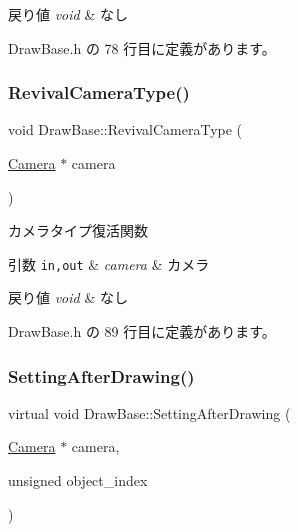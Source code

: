 \begin{DoxyRetVals}{戻り値}
{\em void} & なし \\
\hline
\end{DoxyRetVals}


 Draw\+Base.\+h の 78 行目に定義があります。

\mbox{\label{class_draw_base_a48b144e61928b7658c7a849017e40c79}} 
\subsubsection{\texorpdfstring{Revival\+Camera\+Type()}{RevivalCameraType()}}
{\footnotesize\ttfamily void Draw\+Base\+::\+Revival\+Camera\+Type (\begin{DoxyParamCaption}\item[{\mbox{\hyperlink{class_camera}{Camera}} $\ast$}]{camera }\end{DoxyParamCaption})\hspace{0.3cm}{\ttfamily [inline]}}



カメラタイプ復活関数 


\begin{DoxyParams}[1]{引数}
\mbox{\tt in,out}  & {\em camera} & カメラ \\
\hline
\end{DoxyParams}

\begin{DoxyRetVals}{戻り値}
{\em void} & なし \\
\hline
\end{DoxyRetVals}


 Draw\+Base.\+h の 89 行目に定義があります。

\mbox{\label{class_draw_base_afe64f27b0bbf8c45da7aa0de4c3f3d65}} 
\subsubsection{\texorpdfstring{Setting\+After\+Drawing()}{SettingAfterDrawing()}}
{\footnotesize\ttfamily virtual void Draw\+Base\+::\+Setting\+After\+Drawing (\begin{DoxyParamCaption}\item[{\mbox{\hyperlink{class_camera}{Camera}} $\ast$}]{camera,  }\item[{unsigned}]{object\+\_\+index }\end{DoxyParamCaption})\hspace{0.3cm}{\ttfamily [pure virtual]}}



